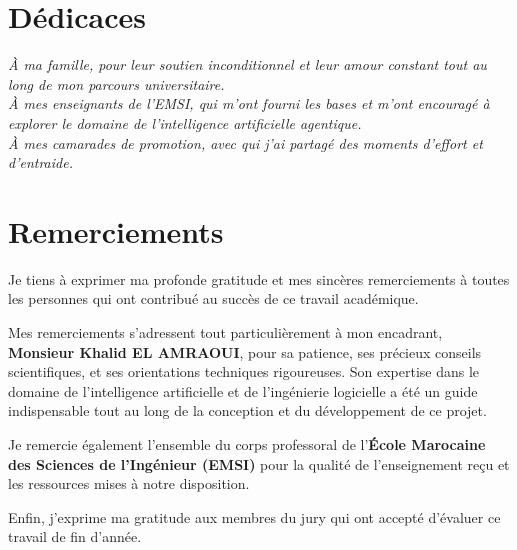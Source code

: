 \documentclass[11pt,a4paper]{report}
\begin{document}
\newpage
\section*{Dédicaces}
\vspace*{2cm}
\begin{center}
    \textit{À ma famille, pour leur soutien inconditionnel et leur amour constant tout au long de mon parcours universitaire.}\\
    \vspace{1cm}
    \textit{À mes enseignants de l'EMSI, qui m'ont fourni les bases et m'ont encouragé à explorer le domaine de l'intelligence artificielle agentique.}\\
    \vspace{1cm}
    \textit{À mes camarades de promotion, avec qui j'ai partagé des moments d'effort et d'entraide.}
\end{center}

\newpage
\section*{Remerciements}

Je tiens à exprimer ma profonde gratitude et mes sincères remerciements à toutes les personnes qui ont contribué au succès de ce travail académique.

Mes remerciements s'adressent tout particulièrement à mon encadrant, \textbf{Monsieur Khalid EL AMRAOUI}, pour sa patience, ses précieux conseils scientifiques, et ses orientations techniques rigoureuses. Son expertise dans le domaine de l'intelligence artificielle et de l'ingénierie logicielle a été un guide indispensable tout au long de la conception et du développement de ce projet.

Je remercie également l'ensemble du corps professoral de l'\textbf{École Marocaine des Sciences de l'Ingénieur (EMSI)} pour la qualité de l'enseignement reçu et les ressources mises à notre disposition. 

Enfin, j'exprime ma gratitude aux membres du jury qui ont accepté d'évaluer ce travail de fin d'année.

\newpage

\end{document}
